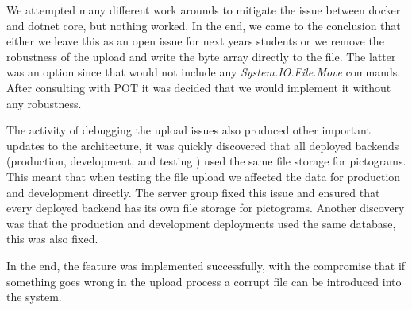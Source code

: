 We attempted many different work arounds to mitigate the issue between docker and dotnet core, but nothing worked. In the end, we came to the conclusion that either we leave this as an open issue for next years students or we remove the robustness of the upload and write the byte array directly to the file. The latter was an option since that would not include any \textit{System.IO.File.Move} commands. After consulting with \gls{POT} it was decided that we would implement it without any robustness.

The activity of debugging the upload issues also produced other important updates to the architecture, it was quickly discovered that all deployed backends (production, development, and testing ) used the same file storage for pictograms. This meant that when testing the file upload we affected the data for production and development directly. The server group fixed this issue and ensured that every deployed backend has its own file storage for pictograms. Another discovery was that the production and development deployments used the same database, this was also fixed.

In the end, the feature was implemented successfully, with the compromise that if something goes wrong in the upload process a corrupt file can be introduced into the system.